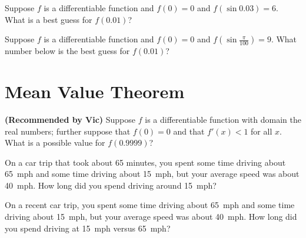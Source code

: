 \documentclass{ximera}
\newcommand{\recommendation}[1]{\textbf{(Recommended by #1)}}
\begin{document}
\begin{problem}
  Suppose $f$ is a differentiable function and $f(0) = 0$ and
  $f(\sin 0.03) = 6$.  What is a best guess for $f(0.01)$?
  \begin{multipleChoice}
  \end{multipleChoice}
\end{problem}

\begin{problem}
  Suppose $f$ is a differentiable function and $f(0) = 0$ and
  $f(\sin \frac{\pi}{100}) = 9$.  What number below is the best guess for $f(0.01)$?
  \begin{multipleChoice}
  \end{multipleChoice}
\end{problem}

\clearpage

\section{Mean Value Theorem}

\begin{problem}
\recommendation{Vic}
  Suppose $f$ is a differentiable function with domain the real numbers; further suppose that $f(0) = 0$ and that $f'(x) < 1$ for all $x$.  What is a possible value for $f(0.9999)$?
  \begin{multipleChoice}
  \end{multipleChoice}
\end{problem}

\begin{problem}
  On a car trip that took about 65 minutes, you spent some time
  driving about 65~mph and some time driving about 15~mph, but your
  average speed was about 40~mph.  How long did you spend driving
  around 15~mph?
  \begin{multipleChoice}
  \end{multipleChoice}
\end{problem}

\begin{problem}
  On a recent car trip, you spent some time driving about 65~mph and
  some time driving about 15~mph, but your average speed was about
  40~mph.  How long did you spend driving at 15~mph versus 65~mph?
  \begin{multipleChoice}
  \end{multipleChoice}
\end{problem}
\end{document}
